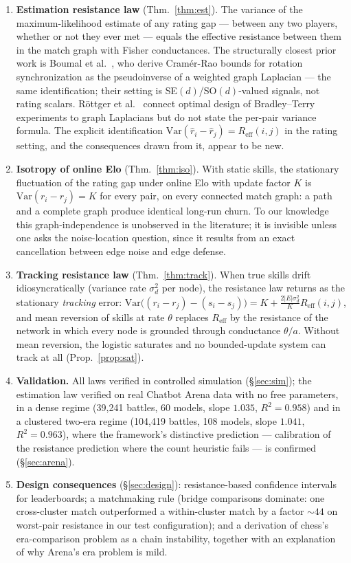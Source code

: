 \documentclass[11pt]{article}
\newcommand{\Reff}{R_{\mathrm{eff}}}
\newcommand{\Var}{\mathrm{Var}}
\begin{document}
\begin{enumerate}
\item \textbf{Estimation resistance law} (Thm.~\ref{thm:est}). The
variance of the maximum-likelihood estimate of any rating gap --- between
any two players, whether or not they ever met --- equals the effective
resistance between them in the match graph with Fisher conductances. The
structurally closest prior work is Boumal et al.\ \cite{boumal2014},
who derive Cram\'er-Rao bounds for rotation synchronization as the
pseudoinverse of a weighted graph Laplacian --- the same identification;
their setting is SE$(d)$/SO$(d)$-valued signals, not rating scalars.
R\"ottger et al.\ \cite{rottger2022} connect optimal design of
Bradley--Terry experiments to graph Laplacians but do not state the
per-pair variance formula.  The explicit identification
$\Var(\hat r_i - \hat r_j) = \Reff(i,j)$ in the rating setting, and
the consequences drawn from it, appear to be new.
\item \textbf{Isotropy of online Elo} (Thm.~\ref{thm:iso}). With static
skills, the stationary fluctuation of the rating gap under online Elo
with update factor $K$ is $\Var(r_i - r_j) = K$ for every pair, on every
connected match graph: a path and a complete graph produce identical
long-run churn. To our knowledge this graph-independence is unobserved in
the literature; it is invisible unless one asks the noise-location
question, since it results from an exact cancellation between edge noise
and edge defense.
\item \textbf{Tracking resistance law} (Thm.~\ref{thm:track}). When true
skills drift idiosyncratically (variance rate $\sigma_d^2$ per node), the
resistance law returns as the stationary \emph{tracking} error:
$\Var\!\big((r_i - r_j) - (s_i - s_j)\big) = K + \tfrac{2|E|\sigma_d^2}{K}
\Reff(i,j)$, and mean reversion of skills at rate $\theta$ replaces
$\Reff$ by the resistance of the network in which every node is grounded
through conductance $\theta/a$. Without mean reversion, the logistic
saturates and no bounded-update system can track at all
(Prop.~\ref{prop:sat}).
\item \textbf{Validation.} All laws verified in controlled simulation
(\S\ref{sec:sim}); the estimation law verified on real Chatbot Arena data
with no free parameters, in a dense regime (39{,}241 battles, 60 models,
slope $1.035$, $R^2=0.958$) and in a clustered two-era regime (104{,}419
battles, 108 models, slope $1.041$, $R^2 = 0.963$), where the framework's
distinctive prediction --- calibration of the resistance prediction
where the count heuristic fails --- is confirmed (\S\ref{sec:arena}).
\item \textbf{Design consequences} (\S\ref{sec:design}): resistance-based
confidence intervals for leaderboards; a matchmaking rule (bridge
comparisons dominate: one cross-cluster match outperformed a
within-cluster match by a factor ${\sim}44$ on worst-pair resistance in
our test configuration); and a derivation of chess's era-comparison
problem as a chain instability, together with an explanation of why
Arena's era problem is mild.
\end{enumerate}
\end{document}
